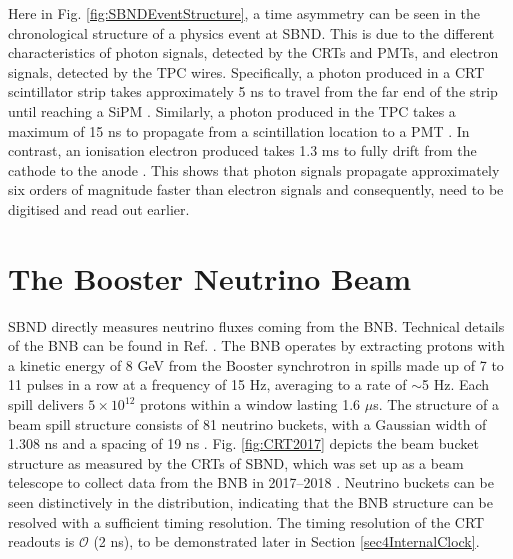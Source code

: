 
Here in Fig. \ref{fig:SBNDEventStructure}, a time asymmetry can be seen in the chronological structure of a physics event at SBND.
This is due to the different characteristics of photon signals, detected by the CRTs and PMTs, and electron signals, detected by the TPC wires. 
Specifically, a photon produced in a CRT scintillator strip takes approximately 5 ns to travel from the far end of the strip until reaching a SiPM \cite{crt_note}. 
Similarly, a photon produced in the TPC takes a maximum of 15 ns to propagate from a scintillation location to a PMT \cite{sbnd_pds_paper}.
In contrast, an ionisation electron produced takes 1.3 ms to fully drift from the cathode to the anode \cite{SBND_Wires}.
This shows that photon signals propagate approximately six orders of magnitude faster than electron signals and consequently, need to be digitised and read out earlier.

\section{The Booster Neutrino Beam}
\label{sec4BNB}

SBND directly measures neutrino fluxes coming from the BNB.
Technical details of the BNB can be found in Ref. \cite{BNBMiniBooNE}.
The BNB operates by extracting protons with a kinetic energy of 8 GeV from the Booster synchrotron in spills made up of 7 to 11 pulses in a row at a frequency of 15 Hz, averaging to a rate of $\sim$5 Hz.
Each spill delivers $5 \times 10^{12}$ protons within a window lasting 1.6 $\mu$s.
The structure of a beam spill structure consists of 81 neutrino buckets, with a Gaussian width of 1.308 ns and a spacing of 19 ns \cite{BNBsigma}.
Fig. \ref{fig:CRT2017} depicts the beam bucket structure as measured by the CRTs of SBND, which was set up as a beam telescope to collect data from the BNB in 2017--2018 \cite{CPAD2022}.
Neutrino buckets can be seen distinctively in the distribution, indicating that the BNB structure can be resolved with a sufficient timing resolution.
The timing resolution of the CRT readouts is $\mathcal{O}$ (2 ns), to be demonstrated later in Section \ref{sec4InternalClock}.

